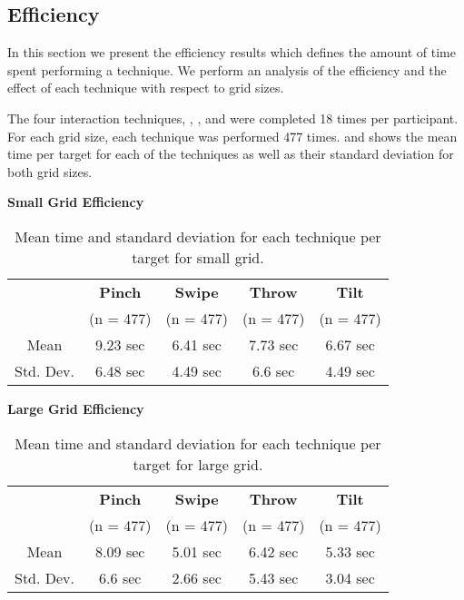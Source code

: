 \subsection{Efficiency}
In this section we present the efficiency results which defines the amount of time spent performing a technique.
We perform an analysis of the efficiency and the effect of each technique with respect to grid sizes.

The four interaction techniques, \pinch, \swipe, \throw and \tilt were completed 18 times per participant. 
For each grid size, each technique was performed 477 times. 
 and  shows the mean time per target for each of the techniques as well as their standard deviation for both grid sizes. 
\begin{table}[H]
	\centering
	\textbf{Small Grid Efficiency}\\[4pt]
	\begin{tabular}{|c|c|c|c|c|}
		\hline
		\rowcolor[HTML]{9B9B9B} 
		 & \textbf{Pinch} & \textbf{Swipe} & \textbf{Throw} & \textbf{Tilt} \\ 
		 \rowcolor[HTML]{9B9B9B} 
		 & (n = 477) & (n = 477) & (n = 477) & (n = 477) \\ \hline
		Mean & 9.23  sec         & 6.41 sec          & 7.73 sec          & 6.67 sec         \\ \hline
		Std. Dev. & 6.48 sec & 4.49 sec & 6.6 sec & 4.49 sec \\ \hline
	\end{tabular}
	\caption{Mean time and standard deviation for each technique per target for small grid.}
	\label{tab:meanTimesTechniqueSmall}
\end{table}

\begin{table}[H]
	\centering
	\textbf{Large Grid Efficiency}\\[4pt]
	\begin{tabular}{|c|c|c|c|c|}
		\hline
		\rowcolor[HTML]{9B9B9B} 
		 & \textbf{Pinch} & \textbf{Swipe} & \textbf{Throw} & \textbf{Tilt} \\
		 \rowcolor[HTML]{9B9B9B}
		 & (n = 477) & (n = 477) & (n = 477) & (n = 477) \\ \hline
		Mean & 8.09  sec         & 5.01 sec          & 6.42 sec          & 5.33 sec         \\ \hline
		Std. Dev. & 6.6 sec & 2.66 sec & 5.43 sec & 3.04 sec \\ \hline
	\end{tabular}
	\caption{Mean time and standard deviation for each technique per target for large grid.}
	\label{tab:meanTimesTechniqueLarge}
\end{table}

